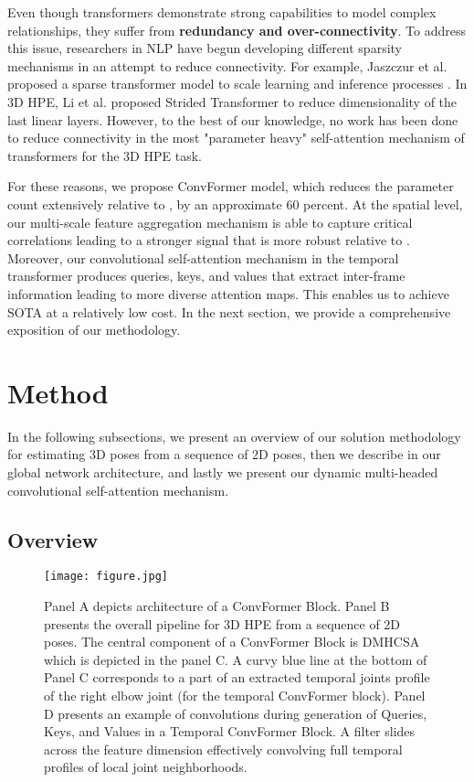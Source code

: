 \documentclass{article}
\begin{document}
Even though transformers demonstrate strong capabilities to model complex relationships, they suffer from \textbf{redundancy and over-connectivity}. To address this issue,  researchers in NLP have begun developing different sparsity mechanisms in an attempt to reduce connectivity. For example, Jaszczur et al. proposed a sparse transformer model to scale learning and inference processes \cite{Jaszczur2021SparseIE}. In 3D HPE, Li et al. proposed Strided Transformer \cite{li2022exploiting} to reduce dimensionality of the last linear layers. However, to the best of our knowledge, no work has been done to reduce connectivity in the most "parameter heavy" self-attention mechanism of transformers for the 3D HPE task. 


For these reasons, we propose ConvFormer model, which reduces the parameter count extensively relative to \cite{ZZMYCD21}, by an approximate 60 percent. At the spatial level, our multi-scale feature aggregation mechanism is able to capture critical correlations leading to a stronger signal that is more robust relative to \cite{ZZMYCD21}. Moreover, our convolutional self-attention mechanism in the temporal transformer produces queries, keys, and values that extract inter-frame information leading to more diverse attention maps. This enables us to achieve SOTA at a relatively low cost. In the next section, we provide a comprehensive exposition of our methodology. 


\section{Method}
In the following subsections, we present an overview of our solution methodology for estimating 3D poses from a sequence of 2D poses, then we describe in our global network architecture, and lastly we present our  dynamic multi-headed convolutional self-attention mechanism.


\subsection{Overview}


\begin{figure*}[!htb]
\centering
\texttt{[image: figure.jpg]}
\caption{\small Panel A depicts  architecture of a ConvFormer Block. Panel B presents the overall pipeline for 3D HPE from a sequence of 2D poses. The central component of a ConvFormer Block is DMHCSA which is depicted in the panel C. A curvy blue line at the bottom of Panel C corresponds to a part of an extracted temporal joints profile of the right elbow joint (for the temporal ConvFormer block). Panel D presents an example of convolutions during generation of Queries, Keys, and Values in a Temporal ConvFormer Block. A filter slides across the feature dimension effectively convolving full temporal profiles of local joint neighborhoods.}
\label{fig: ConvFormer}
\end{figure*}
\end{document}
